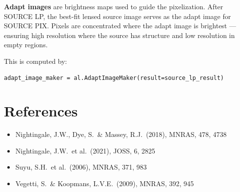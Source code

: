 \documentclass[11pt, letterpaper]{article}
\begin{document}
\textbf{Adapt images} are brightness maps used to guide the pixelization.
After SOURCE LP, the best-fit lensed source image serves as the adapt
image for SOURCE PIX. Pixels are concentrated where the adapt image is
brightest — ensuring high resolution where the source has structure and
low resolution in empty regions.

This is computed by:
\begin{lstlisting}
adapt_image_maker = al.AdaptImageMaker(result=source_lp_result)
\end{lstlisting}

\section*{References}

\begin{itemize}[nosep, leftmargin=*]
  \item Nightingale, J.W., Dye, S.\ \& Massey, R.J.\ (2018), MNRAS, 478, 4738
  \item Nightingale, J.W.\ et al.\ (2021), JOSS, 6, 2825
  \item Suyu, S.H.\ et al.\ (2006), MNRAS, 371, 983
  \item Vegetti, S.\ \& Koopmans, L.V.E.\ (2009), MNRAS, 392, 945
\end{itemize}
\end{document}
